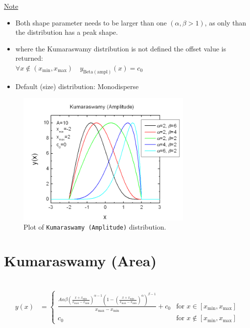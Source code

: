 \uline{Note}
\begin{itemize}
  \item Both shape parameter needs to be larger than one $(\alpha,\beta>1)$, as only than
  the distribution has a peak shape.
  \item where the Kumaraswamy distribution is not defined the offset value is returned: \\
  $\forall x\notin (x_\mathrm{min},x_\mathrm{max})\quad y_\mathrm{Beta (ampl)}(x) = c_0$
  \item Default (size) distribution: Monodisperse
\end{itemize}
\begin{figure}[htb]
\begin{center}
\includegraphics[width=0.768\textwidth]{KumaraswamyAmplitude.png}
\end{center}
\caption{Plot of \texttt{Kumaraswamy (Amplitude)} distribution.}
\label{fig:KumaraswamyAmplitude}
\end{figure}
\clearpage
\section{Kumaraswamy (Area)} ~\\
\label{sec:KumaraswamyArea}
\begin{align}
y(x) & =
\begin{cases}
\frac{A\alpha \beta \left(\frac{x+x_\text{min}}{x_\text{max}-x_\text{min}}\right)^{\alpha-1}{ \left(1-\left(\frac{x+x_\text{min}}{x_\text{max}-x_\text{min}}\right)^\alpha\right)}^{\beta-1}} {x_\text{max}-x_\text{min}}
+c_0 & \mbox{for } x \in [x_\text{min},x_\text{max}] \\
c_0 & \mbox{for } x \notin [x_\text{min},x_\text{max}]
\end{cases}
\end{align}


